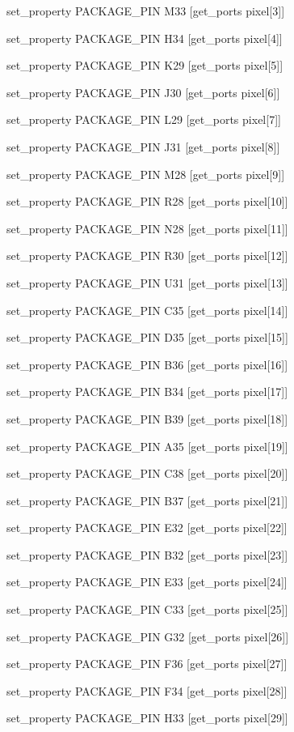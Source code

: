 set\_property PACKAGE\_PIN M33 [get\_ports {pixel[3]}]

set\_property PACKAGE\_PIN H34 [get\_ports {pixel[4]}]

set\_property PACKAGE\_PIN K29 [get\_ports {pixel[5]}]

set\_property PACKAGE\_PIN J30 [get\_ports {pixel[6]}]

set\_property PACKAGE\_PIN L29 [get\_ports {pixel[7]}]

set\_property PACKAGE\_PIN J31 [get\_ports {pixel[8]}]

set\_property PACKAGE\_PIN M28 [get\_ports {pixel[9]}]

set\_property PACKAGE\_PIN R28 [get\_ports {pixel[10]}]

set\_property PACKAGE\_PIN N28 [get\_ports {pixel[11]}]

set\_property PACKAGE\_PIN R30 [get\_ports {pixel[12]}]

set\_property PACKAGE\_PIN U31 [get\_ports {pixel[13]}]

set\_property PACKAGE\_PIN C35 [get\_ports {pixel[14]}]

set\_property PACKAGE\_PIN D35 [get\_ports {pixel[15]}]

set\_property PACKAGE\_PIN B36 [get\_ports {pixel[16]}]

set\_property PACKAGE\_PIN B34 [get\_ports {pixel[17]}]

set\_property PACKAGE\_PIN B39 [get\_ports {pixel[18]}]

set\_property PACKAGE\_PIN A35 [get\_ports {pixel[19]}]

set\_property PACKAGE\_PIN C38 [get\_ports {pixel[20]}]

set\_property PACKAGE\_PIN B37 [get\_ports {pixel[21]}]

set\_property PACKAGE\_PIN E32 [get\_ports {pixel[22]}]

set\_property PACKAGE\_PIN B32 [get\_ports {pixel[23]}]

set\_property PACKAGE\_PIN E33 [get\_ports {pixel[24]}]

set\_property PACKAGE\_PIN C33 [get\_ports {pixel[25]}]

set\_property PACKAGE\_PIN G32 [get\_ports {pixel[26]}]

set\_property PACKAGE\_PIN F36 [get\_ports {pixel[27]}]

set\_property PACKAGE\_PIN F34 [get\_ports {pixel[28]}]

set\_property PACKAGE\_PIN H33 [get\_ports {pixel[29]}]

